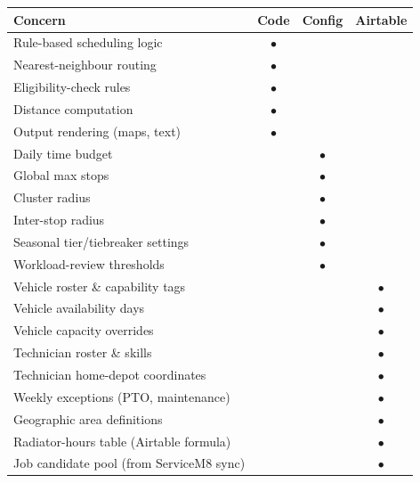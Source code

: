 \documentclass[12pt]{article}
\begin{document}
\medskip
{\small
\begin{longtable}{p{5.2cm}ccc}
\toprule
\textbf{Concern} & \textbf{Code} & \textbf{Config} & \textbf{Airtable} \\
\midrule
Rule-based scheduling logic                   & $\bullet$ &           &           \\
Nearest-neighbour routing                     & $\bullet$ &           &           \\
Eligibility-check rules                       & $\bullet$ &           &           \\
Distance computation                          & $\bullet$ &           &           \\
Output rendering (maps, text)                 & $\bullet$ &           &           \\
\midrule
Daily time budget                             &           & $\bullet$ &           \\
Global max stops                              &           & $\bullet$ &           \\
Cluster radius                                &           & $\bullet$ &           \\
Inter-stop radius                             &           & $\bullet$ &           \\
Seasonal tier/tiebreaker settings             &           & $\bullet$ &           \\
Workload-review thresholds                    &           & $\bullet$ &           \\
\midrule
Vehicle roster \& capability tags             &           &           & $\bullet$ \\
Vehicle availability days                     &           &           & $\bullet$ \\
Vehicle capacity overrides                    &           &           & $\bullet$ \\
Technician roster \& skills                   &           &           & $\bullet$ \\
Technician home-depot coordinates             &           &           & $\bullet$ \\
Weekly exceptions (PTO, maintenance)          &           &           & $\bullet$ \\
Geographic area definitions                   &           &           & $\bullet$ \\
Radiator-hours table (Airtable formula)       &           &           & $\bullet$ \\
Job candidate pool (from ServiceM8 sync)      &           &           & $\bullet$ \\
\bottomrule
\end{longtable}
}
\end{document}
